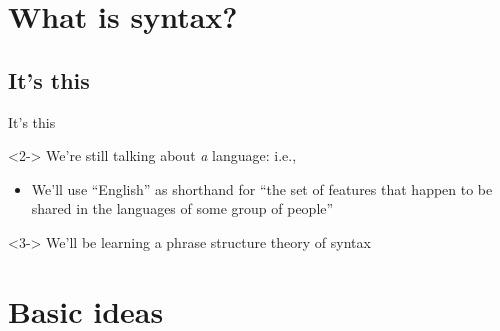 \documentclass{beamer}
\subtitle[Syntax Basics]{Some Basics of Syntax}
\newcommand{\suboneone}{It's this}
\begin{document}
  

  \section{What is syntax?}
    \subsection{\suboneone}
      \begin{frame}{\suboneone}
        \begin{definition}
          
        \end{definition}
        \begin{alertblock}<2->{}
          We're still talking about \emph{a} language: i.e., 
          \begin{itemize}
            \item We'll use ``English'' as shorthand for ``the set of features that happen to be shared in the languages of some group of people''
          \end{itemize}
        \end{alertblock}
        \begin{alertblock}<3->{}
          We'll be learning a phrase structure \parencite{chomsky_syntactic_2002} theory of syntax
        \end{alertblock}
      \end{frame}

  \section{Basic ideas}
\end{document}
